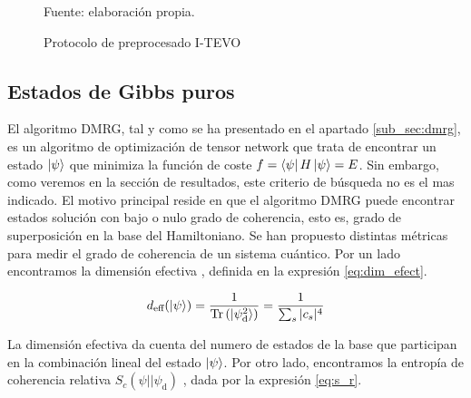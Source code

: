 \begin{figure}[htb]

\caption{Protocolo de preprocesado I-TEVO}
Fuente: elaboración propia.
\label{fig:i_tevo_qaoa}
\end{figure}

\subsection{Estados de Gibbs puros}

El algoritmo DMRG, tal y como se ha presentado en el apartado \ref{sub_sec:dmrg}, es un algoritmo de optimización de tensor network que trata de encontrar un estado $\ket{\psi}$ que minimiza la función de coste $f = \bra{\psi}H\ket{\psi} = E$. Sin embargo, como veremos en la sección de resultados, este criterio de búsqueda no es el mas indicado. El motivo principal reside en que el algoritmo DMRG puede encontrar estados solución con bajo o nulo grado de coherencia, esto es, grado de superposición en la base del Hamiltoniano. Se han propuesto distintas métricas para medir el grado de coherencia de un sistema cuántico. Por un lado encontramos la dimensión efectiva \citep{mori},  definida en la expresión \ref{eq:dim_efect}. 

\begin{equation}
    d_\textrm{eff}(\ket{\psi}) = \frac{1}{\textrm{Tr}\left(\ket{\psi_\textrm{d}^2}\right)}=\frac{1}{\sum_{s}|c_s|^4}
    \label{eq:dim_efect}
\end{equation}

\newpage

La dimensión efectiva da cuenta del numero de estados de la base que participan en la combinación lineal del estado $\ket{\psi}$. Por otro lado, encontramos la entropía de coherencia relativa $S_{c}(\psi||\psi_\textrm{d})$ \citep{xi}, dada por la expresión \ref{eq:s_r}.

